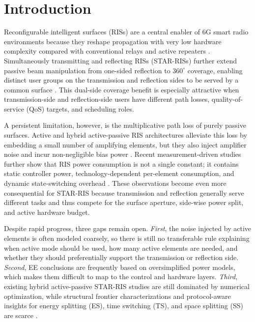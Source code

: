 \documentclass[journal]{IEEEtran}
\begin{document}
\section{Introduction}
Reconfigurable intelligent surfaces (RISs) are a central enabler of 6G smart radio environments because they reshape propagation with very low hardware complexity compared with conventional relays and active repeaters \cite{direnzo2020smart,huang2019ee,wu2019irs,tang2020mimo}. Simultaneously transmitting and reflecting RISs (STAR-RISs) further extend passive beam manipulation from one-sided reflection to $360^\circ$ coverage, enabling distinct user groups on the transmission and reflection sides to be served by a common surface \cite{liu2021star,mu2022star,zuo2021noma}. This dual-side coverage benefit is especially attractive when transmission-side and reflection-side users have different path losses, quality-of-service (QoS) targets, and scheduling roles.

A persistent limitation, however, is the multiplicative path loss of purely passive surfaces. Active and hybrid active-passive RIS architectures alleviate this loss by embedding a small number of amplifying elements, but they also inject amplifier noise and incur non-negligible bias power \cite{ma2023activeee,gao2023active,kunzan2022sub,qi2022sub,peng2023hybrid,huang2024hybrid,nguyen2024uav,zhang2022signal}. Recent measurement-driven studies further show that RIS power consumption is not a single constant; it contains static controller power, technology-dependent per-element consumption, and dynamic state-switching overhead \cite{wang2023static,wang2024practical,fotock2024active}. These observations become even more consequential for STAR-RIS because transmission and reflection generally serve different tasks and thus compete for the surface aperture, side-wise power split, and active hardware budget.

Despite rapid progress, three gaps remain open. \emph{First}, the noise injected by active elements is often modeled coarsely, so there is still no transferable rule explaining when active mode should be used, how many active elements are needed, and whether they should preferentially support the transmission or reflection side. \emph{Second}, EE conclusions are frequently based on oversimplified power models, which makes them difficult to map to the control and hardware layers. \emph{Third}, existing hybrid active-passive STAR-RIS studies are still dominated by numerical optimization, while structural frontier characterizations and protocol-aware insights for energy splitting (ES), time switching (TS), and space splitting (SS) are scarce \cite{vu2025hybridstar,song2025prototype,zhu2025activepassive,soleymani2023starurlcc,xue2023maxmin,zhang2024activestarisac}.
\end{document}
